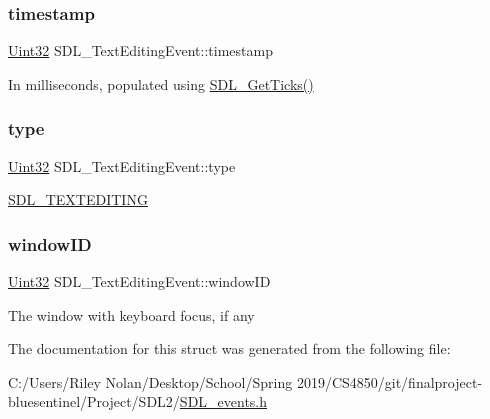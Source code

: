 \subsubsection{\texorpdfstring{timestamp}{timestamp}}
{\footnotesize\ttfamily \mbox{\hyperlink{_s_d_l__stdinc_8h_add440eff171ea5f55cb00c4a9ab8672d}{Uint32}} S\+D\+L\+\_\+\+Text\+Editing\+Event\+::timestamp}

In milliseconds, populated using \mbox{\hyperlink{_s_d_l__timer_8h_a0b9bc71d6287e0ffafdc3419760fe2b3}{S\+D\+L\+\_\+\+Get\+Ticks()}} \mbox{\label{struct_s_d_l___text_editing_event_a198e6df194a3bf12cf5f82553e84c7cb}} 
\subsubsection{\texorpdfstring{type}{type}}
{\footnotesize\ttfamily \mbox{\hyperlink{_s_d_l__stdinc_8h_add440eff171ea5f55cb00c4a9ab8672d}{Uint32}} S\+D\+L\+\_\+\+Text\+Editing\+Event\+::type}

\mbox{\hyperlink{_s_d_l__events_8h_a3b589e89be6b35c02e0dd34a55f3fccaa1b80c465df69c0b6d06f026ce7a230e3}{S\+D\+L\+\_\+\+T\+E\+X\+T\+E\+D\+I\+T\+I\+NG}} \mbox{\label{struct_s_d_l___text_editing_event_a23b3e414cf7a7ccc547b7595ca930049}} 
\subsubsection{\texorpdfstring{windowID}{windowID}}
{\footnotesize\ttfamily \mbox{\hyperlink{_s_d_l__stdinc_8h_add440eff171ea5f55cb00c4a9ab8672d}{Uint32}} S\+D\+L\+\_\+\+Text\+Editing\+Event\+::window\+ID}

The window with keyboard focus, if any 

The documentation for this struct was generated from the following file\+:\begin{DoxyCompactItemize}
\item 
C\+:/\+Users/\+Riley Nolan/\+Desktop/\+School/\+Spring 2019/\+C\+S4850/git/finalproject-\/bluesentinel/\+Project/\+S\+D\+L2/\mbox{\hyperlink{_s_d_l__events_8h}{S\+D\+L\+\_\+events.\+h}}\end{DoxyCompactItemize}
